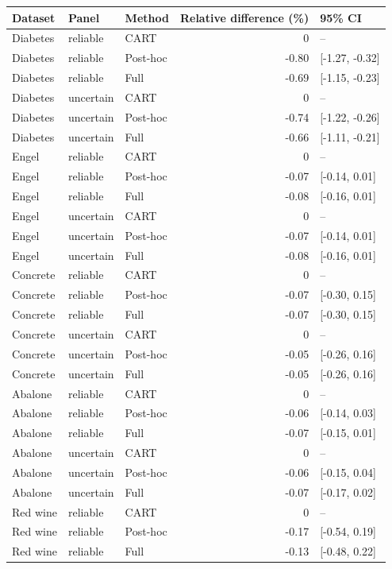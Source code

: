 \begin{tabular}{lllrl}
\toprule
Dataset & Panel & Method & Relative difference (\%) & 95\% CI \\
\midrule
Diabetes & reliable & CART & 0 & -- \\
Diabetes & reliable & Post-hoc & -0.80 & [-1.27, -0.32] \\
Diabetes & reliable & Full & -0.69 & [-1.15, -0.23] \\
Diabetes & uncertain & CART & 0 & -- \\
Diabetes & uncertain & Post-hoc & -0.74 & [-1.22, -0.26] \\
Diabetes & uncertain & Full & -0.66 & [-1.11, -0.21] \\
Engel & reliable & CART & 0 & -- \\
Engel & reliable & Post-hoc & -0.07 & [-0.14, 0.01] \\
Engel & reliable & Full & -0.08 & [-0.16, 0.01] \\
Engel & uncertain & CART & 0 & -- \\
Engel & uncertain & Post-hoc & -0.07 & [-0.14, 0.01] \\
Engel & uncertain & Full & -0.08 & [-0.16, 0.01] \\
Concrete & reliable & CART & 0 & -- \\
Concrete & reliable & Post-hoc & -0.07 & [-0.30, 0.15] \\
Concrete & reliable & Full & -0.07 & [-0.30, 0.15] \\
Concrete & uncertain & CART & 0 & -- \\
Concrete & uncertain & Post-hoc & -0.05 & [-0.26, 0.16] \\
Concrete & uncertain & Full & -0.05 & [-0.26, 0.16] \\
Abalone & reliable & CART & 0 & -- \\
Abalone & reliable & Post-hoc & -0.06 & [-0.14, 0.03] \\
Abalone & reliable & Full & -0.07 & [-0.15, 0.01] \\
Abalone & uncertain & CART & 0 & -- \\
Abalone & uncertain & Post-hoc & -0.06 & [-0.15, 0.04] \\
Abalone & uncertain & Full & -0.07 & [-0.17, 0.02] \\
Red wine & reliable & CART & 0 & -- \\
Red wine & reliable & Post-hoc & -0.17 & [-0.54, 0.19] \\
Red wine & reliable & Full & -0.13 & [-0.48, 0.22] \\

\end{tabular}
